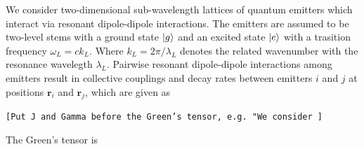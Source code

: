 \documentclass[aps,pra,superscriptaddress,twocolumn]{revtex4-1}
\newcommand{\rr}{\mathbf{r}}
\newcommand{\commentSB}[1]{\texttt{\color{blue}[#1]}}
\newcommand{\commentTP}[1]{\texttt{\color{green}[#1]}}
\begin{document}
We consider two-dimensional sub-wavelength lattices of quantum emitters which interact via resonant dipole-dipole interactions. The emitters are assumed to be two-level stems with a ground state $\ket{g}$ and an excited state $\ket{e}$ with a trasition frequency $\omega_L = c k_L$. Where $k_L = 2\pi/\lambda_L$ denotes the related wavenumber with the resonance wavelegth $\lambda_L$. Pairwise resonant dipole-dipole interactions among emitters result in collective couplings and decay rates between emitters $i$ and $j$ at positions $\rr_i$ and $\rr_j$, which are given as




\commentTP{Put J and Gamma before the Green's tensor, e.g. "We consider }





The Green's tensor is 


\end{document}
